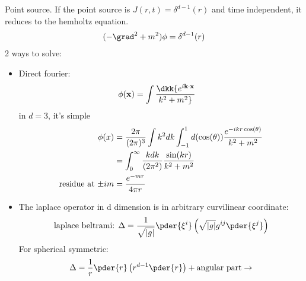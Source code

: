 \documentclass[10pt]{scrartcl}
\begin{document}
Point source.  If the point source is $J(r, t) = \delta^{d-1} (r)$ and time independent, it reduces to the hemholtz equation.
\begin{align}
	(- \grad^2 + m^2) \phi = \delta^{d-1} (r)
	\end{align}
2 ways to solve:
\begin{itemize}
	\item Direct fourier:
	\begin{align}
		\phi(\mathbf{x}) &= \int \dkk {e^{i {\mathbf{k}} \cdot{\mathbf{x}}}  \over k^2 + m^2}
		\end{align}
	in $d = 3$, it's simple
	\begin{align}
		\phi(x) &={2 \pi  \over (2 \pi)^3} \int k^2 dk \int_{-1}^1 d (\cos(\theta)) {e^{-ikr \cos(\theta)} \over k^2 + m^2} \\
		&= \int_0^{\infty} {k dk \over (2 \pi^2)} {\sin(kr) \over k^2 + m^2} \\
		\text{residue at $\pm im$} &= {e^{-mr} \over 4 \pi r}
		\end{align}
\item The laplace operator in d dimension is in arbitrary curvilinear coordinate:
\begin{align}
	\text{laplace beltrami:  } \Delta = {1 \over \sqrt{|g|}} \pder{\xi^i} \left(\sqrt{|g|} g^{ij} \pder{\xi^j}  \right)
	\end{align}
For spherical symmetric:
\begin{align}
	\Delta = {1 \over r} \pder{r} \left(r^{d-1} \pder{r} \right) + \text{angular part}
	\rightarrow 
	\end{align}
\end{itemize}
\end{document}
